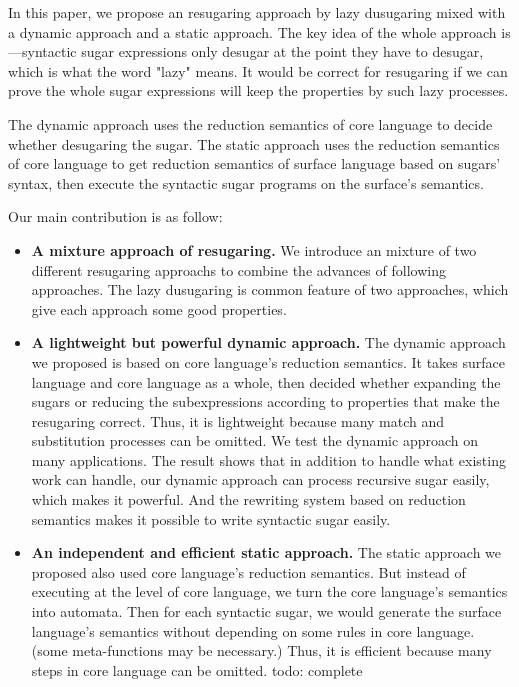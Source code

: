 
In this paper, we propose an resugaring approach by lazy dusugaring mixed with a dynamic approach and a static approach. The key idea of the whole approach is---syntactic sugar expressions only desugar at the point they have to desugar, which is what the word "lazy" means. It would be correct for resugaring if we can prove the whole sugar expressions will keep the properties by such lazy processes.

The dynamic approach uses the reduction semantics\cite{reduction} of core language to decide whether desugaring the sugar. The static approach uses the reduction semantics of core language to get reduction semantics of surface language based on sugars' syntax, then execute the syntactic sugar programs on the surface's semantics. 

Our main contribution is as follow:
\begin{itemize}
\item {\bfseries A mixture approach of resugaring.} We introduce an mixture of two different resugaring approachs to combine the advances of following approaches. The lazy dusugaring is common feature of two approaches, which give each approach some good properties.
\item {\bfseries A lightweight but powerful dynamic approach.} The dynamic approach we proposed is based on core language's reduction semantics. It takes surface language and core language as a whole, then decided whether expanding the sugars or reducing the subexpressions according to properties that make the resugaring correct. Thus, it is lightweight because many match and substitution processes can be omitted. We test the dynamic approach on many applications. The result shows that in addition to handle what existing work can handle, our dynamic approach can process recursive sugar easily, which makes it powerful. And the rewriting system based on reduction semantics makes it possible to write syntactic sugar easily.
\item {\bfseries An independent and efficient static approach.} The static approach we proposed also used core language's reduction semantics. But instead of executing at the level of core language, we turn the core language's semantics into automata. Then for each syntactic sugar, we would generate the surface language's semantics without depending on some rules in core language. (some meta-functions may be necessary.) Thus, it is efficient because many steps in core language can be omitted. todo: complete
\end{itemize}


